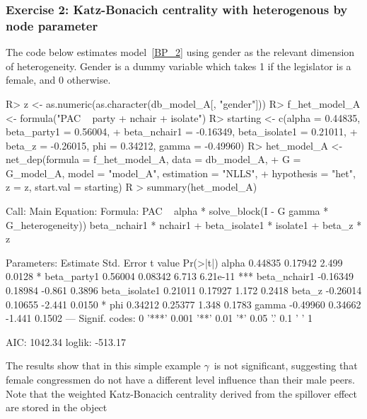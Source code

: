 \documentclass[nojss]{jss}
\begin{document}
	\subsubsection{Exercise 2: Katz-Bonacich centrality with heterogenous by node parameter}
	
	The code below estimates model~\ref{BP_2} using gender as the
	relevant dimension of heterogeneity. Gender is a dummy variable
	which takes 1 if the legislator is a female, and 0 otherwise. 
	\begin{CodeChunk}
		\begin{CodeInput}
			R> z <- as.numeric(as.character(db_model_A[, "gender"]))
			R> f_het_model_A <- formula("PAC ~ party + nchair + isolate")
			R> starting <- c(alpha = 0.44835, beta_party1 = 0.56004,
			+    beta_nchair1 = -0.16349, beta_isolate1 = 0.21011,
			+    beta_z = -0.26015, phi = 0.34212, gamma = -0.49960)
			R> het_model_A <- net_dep(formula = f_het_model_A, data = db_model_A,
			+    G = G_model_A, model = "model_A", estimation = "NLLS",
			+    hypothesis = "het", z = z, start.val = starting)
			R > summary(het_model_A)
		\end{CodeInput}
		\begin{CodeOutput}
			Call:
			Main Equation:  
			Formula: PAC ~ alpha * solve_block(I - G %
			gamma * G_heterogeneity)) %
			beta_nchair1 * nchair1 + beta_isolate1 * isolate1 + beta_z * z
			
			Parameters:
			Estimate Std. Error t value Pr(>|t|)    
			alpha          0.44835    0.17942   2.499   0.0128 *  
			beta_party1    0.56004    0.08342   6.713 6.21e-11 ***
			beta_nchair1  -0.16349    0.18984  -0.861   0.3896    
			beta_isolate1  0.21011    0.17927   1.172   0.2418    
			beta_z        -0.26014    0.10655  -2.441   0.0150 *  
			phi            0.34212    0.25377   1.348   0.1783    
			gamma         -0.49960    0.34662  -1.441   0.1502    
			---
			Signif. codes:  0 '***' 0.001 '**' 0.01 '*' 0.05 '.' 0.1 ' ' 1
			
			AIC: 1042.34  loglik: -513.17
		\end{CodeOutput}
	\end{CodeChunk}
	The results show that in this simple example $\gamma$\ is not significant, suggesting that female congressmen do not have a different level influence than their male peers. Note that the weighted Katz-Bonacich centrality derived from the spillover effect are stored in the object 
	
\end{document}
